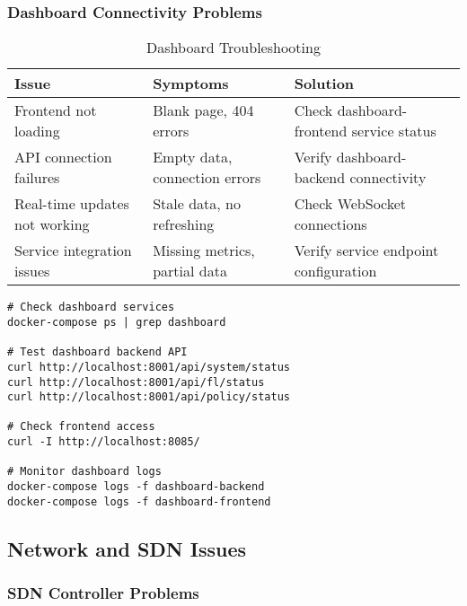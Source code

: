 \subsubsection{Dashboard Connectivity Problems}

\begin{table}[H]
\centering
\caption{Dashboard Troubleshooting}
\label{tab:dashboard-issues}
\begin{tabularx}{\textwidth}{@{}lXX@{}}
\toprule
\textbf{Issue} & \textbf{Symptoms} & \textbf{Solution} \\
\midrule
Frontend not loading & Blank page, 404 errors & Check dashboard-frontend service status \\
API connection failures & Empty data, connection errors & Verify dashboard-backend connectivity \\
Real-time updates not working & Stale data, no refreshing & Check WebSocket connections \\
Service integration issues & Missing metrics, partial data & Verify service endpoint configuration \\
\bottomrule
\end{tabularx}
\end{table}

\begin{lstlisting}[style=bashcode, caption=Dashboard Diagnostics]
# Check dashboard services
docker-compose ps | grep dashboard

# Test dashboard backend API
curl http://localhost:8001/api/system/status
curl http://localhost:8001/api/fl/status
curl http://localhost:8001/api/policy/status

# Check frontend access
curl -I http://localhost:8085/

# Monitor dashboard logs
docker-compose logs -f dashboard-backend
docker-compose logs -f dashboard-frontend
\end{lstlisting}

\subsection{Network and SDN Issues}

\subsubsection{SDN Controller Problems}


